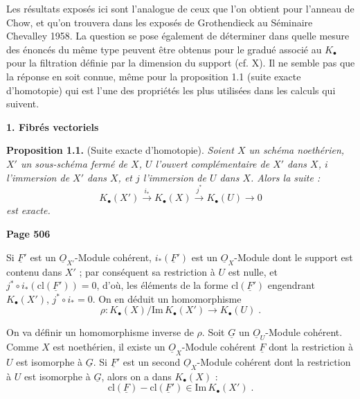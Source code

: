 Les r\'esultats expos\'es ici sont l'analogue de ceux que l'on obtient pour l'anneau de Chow, et qu'on trouvera dans les expos\'es de Grothendieck au S\'eminaire Chevalley 1958. La question se pose \'egalement de d\'eterminer dans quelle mesure des \'enonc\'es du m\^eme type peuvent \^etre obtenus pour le gradu\'e associ\'e au $K_\bullet$ pour la filtration d\'efinie par la dimension du support (cf. X). Il ne semble pas que la r\'eponse en soit connue, m\^eme pour la proposition 1.1 (suite exacte d'homotopie) qui est l'une des propri\'et\'es les plus utilis\'ees dans les calculs qui suivent.

\medskip
\noindent\textbf{1. Fibr\'es vectoriels}

\smallskip
\noindent\textbf{Proposition 1.1.} (Suite exacte d'homotopie). \textit{Soient $X$ un sch\'ema noeth\'erien, $X'$ un sous-sch\'ema ferm\'e de $X$, $U$ l'ouvert compl\'ementaire de $X'$ dans $X$, $i$ l'immersion de $X'$ dans $X$, et $j$ l'immersion de $U$ dans $X$. Alors la suite :
\[
K_\bullet(X') \xrightarrow{\;i_*\;} K_\bullet(X) \xrightarrow{\;j^*\;} K_\bullet(U) \longrightarrow 0
\]
est exacte.}

\newpage
\noindent\textbf{Page 506}

Si $\underline{F}'$ est un $\underline{O}_{X'}$-Module coh\'erent, $i_*(\underline{F}')$ est un $\underline{O}_X$-Module dont le support est contenu dans $X'$ ; par cons\'equent sa restriction \`a $U$ est nulle, et $j^* \circ i_* (\mathrm{cl}(\underline{F}')) = 0$, d'o\`u, les \'el\'ements de la forme $\mathrm{cl}(\underline{F}')$ engendrant $K_\bullet(X')$, $j^* \circ i_* = 0$. On en d\'eduit un homomorphisme
\[
\rho : K_\bullet(X)/\mathrm{Im}\,K_\bullet(X') \longrightarrow K_\bullet(U)\;.
\]

On va d\'efinir un homomorphisme inverse de $\rho$. Soit $\underline{G}$ un $\underline{O}_U$-Module coh\'erent. Comme $X$ est noeth\'erien, il existe un $\underline{O}_X$-Module coh\'erent $\underline{F}$ dont la restriction \`a $U$ est isomorphe \`a $\underline{G}$. Si $\underline{F}'$ est un second $\underline{O}_X$-Module coh\'erent dont la restriction \`a $U$ est isomorphe \`a $\underline{G}$, alors on a dans $K_\bullet(X)$ :
\[
\mathrm{cl}(\underline{F}) - \mathrm{cl}(\underline{F}') \in \mathrm{Im}\,K_\bullet(X')\;.
\]


